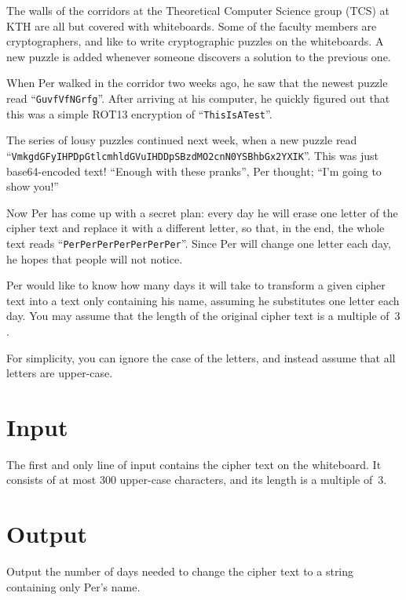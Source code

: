 

The walls of the corridors at the Theoretical Computer Science group (TCS) at KTH
are all but covered with whiteboards. Some of the faculty members are cryptographers,
and like to write cryptographic puzzles on the whiteboards. A new puzzle is added
whenever someone discovers a solution to the previous one.

When Per walked in the corridor two weeks ago, he saw that the newest puzzle read
``\texttt{GuvfVfNGrfg}''. After arriving at his computer, he quickly figured out that this was
a simple ROT13 encryption of ``\texttt{ThisIsATest}''.

The series of lousy puzzles continued next week, when a new puzzle read\\
``\texttt{VmkgdGFyIHPDpGtlcmhldGVuIHDDpSBzdMO2cnN0YSBhbGx2YXIK}''.
This was just base64-encoded text! ``Enough with these pranks'', Per thought; ``I'm going to show you!''

Now Per has come up with a secret plan: every day he will erase one letter of the cipher text and
replace it with a different letter, so that, in the end, the whole text reads ``\texttt{PerPerPerPerPerPerPer}''.
Since Per will change one letter each day, he hopes that people will not notice.

Per would like to know how many days it will take to transform a given cipher text into a text only
containing his name, assuming he substitutes one letter each day. You may assume that the length of the
original cipher text is a multiple of~$3$.

For simplicity, you can ignore the case of the letters, and instead assume that all letters are
upper-case.

\section*{Input}

The first and only line of input contains the cipher text on the whiteboard. It consists of at most
$300$ upper-case characters, and its length is a multiple of~$3$.


\section*{Output}

Output the number of days needed to change the cipher text to a string containing only Per's name.

